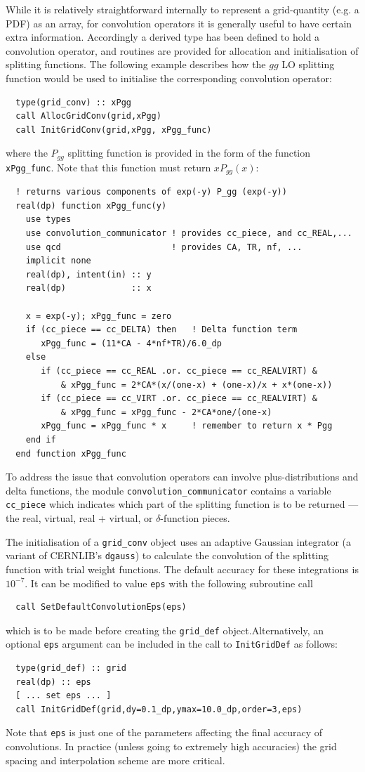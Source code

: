 \documentclass[12pt]{article}
\newcommand{\ttt}[1]{\texttt{#1}}
\begin{document}
While it is relatively straightforward internally to represent a
grid-quantity (e.g. a PDF) as an array, for convolution
operators  it is generally useful to have certain extra
information. Accordingly a derived type has been defined to hold a
convolution operator, and routines are provided for allocation and
initialisation of splitting functions.
%
The following example describes how the $gg$ LO splitting function
would be used to initialise the corresponding 
convolution operator:
\begin{lstlisting}
  type(grid_conv) :: xPgg
  call AllocGridConv(grid,xPgg)
  call InitGridConv(grid,xPgg, xPgg_func)
\end{lstlisting}
where the $P_{gg}$ splitting function is provided in the form of the
function \texttt{xPgg\_func}. Note that this function
must return $xP_{gg}(x)$:
\begin{lstlisting}
  ! returns various components of exp(-y) P_gg (exp(-y))
  real(dp) function xPgg_func(y)
    use types
    use convolution_communicator ! provides cc_piece, and cc_REAL,...
    use qcd                      ! provides CA, TR, nf, ...
    implicit none
    real(dp), intent(in) :: y
    real(dp)             :: x

    x = exp(-y); xPgg_func = zero
    if (cc_piece == cc_DELTA) then   ! Delta function term
       xPgg_func = (11*CA - 4*nf*TR)/6.0_dp
    else
       if (cc_piece == cc_REAL .or. cc_piece == cc_REALVIRT) & 
           & xPgg_func = 2*CA*(x/(one-x) + (one-x)/x + x*(one-x))
       if (cc_piece == cc_VIRT .or. cc_piece == cc_REALVIRT) & 
           & xPgg_func = xPgg_func - 2*CA*one/(one-x)
       xPgg_func = xPgg_func * x     ! remember to return x * Pgg
    end if
  end function xPgg_func
\end{lstlisting}
To address the issue that convolution operators can involve
plus-distributions and delta functions, the module
\texttt{convolution\_communicator} contains a variable
\texttt{cc\_piece} which indicates which part of the splitting
function is to be returned --- the real, virtual, real + virtual, or
$\delta$-function pieces. 

The initialisation of a \texttt{grid\_conv} object uses an adaptive
Gaussian integrator (a variant of CERNLIB's \texttt{dgauss}) to
calculate the convolution of the splitting function with trial weight
functions. The default accuracy for these integrations is $10^{-7}$.
It can be modified to value \texttt{eps} with the following subroutine
call
\begin{lstlisting}
  call SetDefaultConvolutionEps(eps)
\end{lstlisting}
which is to be made before creating the \ttt{grid\_def}
object.Alternatively, an optional \ttt{eps} argument can be
  included in the call to \ttt{InitGridDef} as follows:
\begin{lstlisting}
  type(grid_def) :: grid
  real(dp) :: eps
  [ ... set eps ... ]
  call InitGridDef(grid,dy=0.1_dp,ymax=10.0_dp,order=3,eps)
 \end{lstlisting}
Note that {\tt eps} is just
one of the parameters affecting the final accuracy of convolutions. In
practice (unless going to extremely high accuracies) the grid spacing
and interpolation scheme are more critical.
\end{document}
